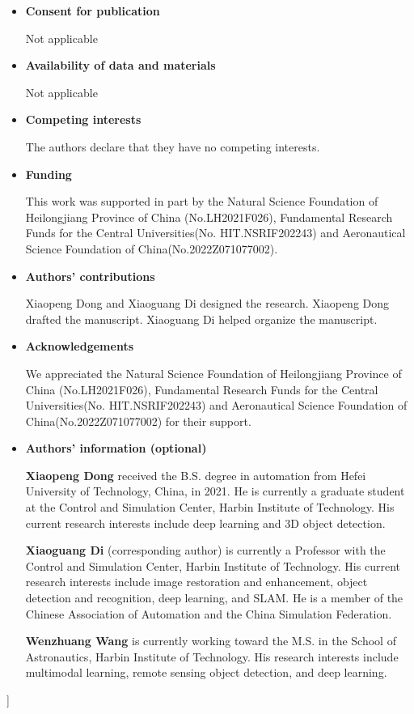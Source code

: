\begin{sloppypar}
\begin{@twocolumnfalse}
\begin{itemize}
\item \textbf{Consent for publication}

Not applicable

\item \textbf{Availability of data and materials}

Not applicable

\item \textbf{Competing interests}

The authors declare that they have no competing interests.

\item \textbf{Funding}

This work was supported in part by the Natural Science Foundation of
Heilongjiang Province of China (No.LH2021F026), Fundamental Research Funds for the Central Universities(No. HIT.NSRIF202243) and Aeronautical Science Foundation of China(No.2022Z071077002).


\item \textbf{Authors' contributions}

Xiaopeng Dong and Xiaoguang Di designed the research. Xiaopeng Dong drafted the manuscript. Xiaoguang Di helped organize the manuscript. 

\item \textbf{Acknowledgements}

We appreciated the Natural Science Foundation of Heilongjiang Province of China (No.LH2021F026), Fundamental Research Funds for the Central
Universities(No. HIT.NSRIF202243) and Aeronautical Science Foundation of China(No.2022Z071077002) for their support.

\item \textbf{Authors' information (optional)}

\textbf{Xiaopeng Dong} received the B.S. degree in automation from Hefei University of Technology, China, in 2021. He is currently a graduate student at the Control and Simulation Center, Harbin Institute of Technology. His current research interests include deep learning and 3D object detection.

\textbf{Xiaoguang Di} (corresponding author) is currently a Professor with the Control and Simulation Center, Harbin Institute of Technology. His current research interests include image restoration and enhancement, object detection and recognition, deep learning, and SLAM. He is a member of the Chinese Association of Automation and the China Simulation Federation.

\textbf{Wenzhuang Wang} is currently working toward the M.S. in the School of Astronautics, Harbin Institute of Technology. His research interests include multimodal learning, remote sensing object detection, and deep learning.



\end{itemize}
\end{@twocolumnfalse}
]

\clearpage


\end{sloppypar}
%
%


